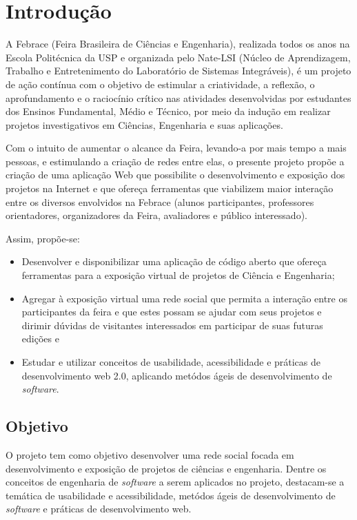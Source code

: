 
\chapter{Introdução}

  A Febrace (Feira Brasileira de Ciências e Engenharia), realizada todos os anos na Escola Politécnica da USP e organizada pelo Nate-LSI (Núcleo de Aprendizagem, Trabalho e Entretenimento do Laboratório de Sistemas Integráveis), é um projeto de ação contínua com o objetivo de estimular a criatividade, a reflexão, o aprofundamento e o raciocínio crítico nas atividades desenvolvidas por estudantes dos Ensinos Fundamental, Médio e Técnico, por meio da indução em realizar projetos investigativos em Ciências, Engenharia e suas aplicações\cite{lopes07}.

  Com o intuito de aumentar o alcance da Feira, levando-a por mais tempo a mais pessoas, e estimulando a criação de redes entre elas, o presente projeto propõe a criação de uma aplicação Web que possibilite o desenvolvimento e exposição dos projetos na Internet e que ofereça ferramentas que viabilizem maior interação entre os diversos envolvidos na Febrace (alunos participantes, professores orientadores, organizadores da Feira, avaliadores e público interessado).

  Assim, propõe-se:

  \begin{itemize}
    \item{
      Desenvolver e disponibilizar uma aplicação de código aberto que ofereça ferramentas para a exposição virtual de projetos de Ciência e Engenharia;
    }
    \item{
		Agregar à exposição virtual uma rede social que permita a interação entre os participantes da feira e que estes possam se ajudar com seus projetos e dirimir dúvidas de visitantes interessados em participar de suas futuras edições e
    }
    \item{
		Estudar e utilizar conceitos de usabilidade, acessibilidade e práticas de desenvolvimento web 2.0, aplicando metódos ágeis de desenvolvimento de \textit{software}.
    }
  \end{itemize}

  \section{Objetivo}
    O projeto tem como objetivo desenvolver uma rede social focada em desenvolvimento e exposição de projetos de ciências e engenharia. Dentre os conceitos de engenharia de \textit{software} a serem aplicados no projeto, destacam-se a temática de usabilidade e acessibilidade, metódos ágeis de desenvolvimento de \textit{software} e práticas de desenvolvimento web.
